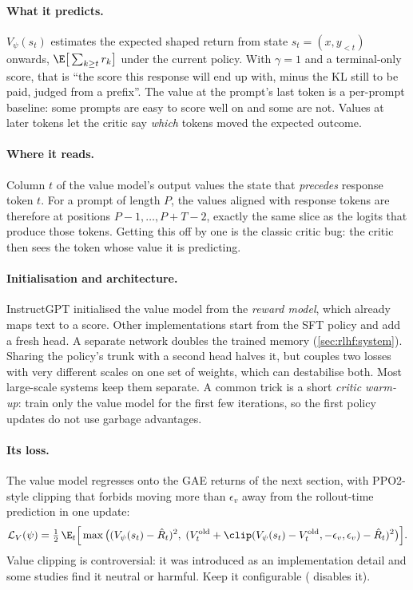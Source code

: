 \paragraph{What it predicts.} $V_\psi(s_t)$ estimates the expected shaped return from state
$s_t = (x, y_{<t})$ onwards, $\E\big[\sum_{k\ge t} r_k\big]$ under the current policy. With
$\gamma=1$ and a terminal-only score, that is ``the score this response will end up with,
minus the KL still to be paid, judged from a prefix''. The value at the prompt's last token is
a per-prompt baseline: some prompts are easy to score well on and some are not. Values at later
tokens let the critic say \emph{which} tokens moved the expected outcome.

\paragraph{Where it reads.} Column $t$ of the value model's output values the state that
\emph{precedes} response token $t$. For a prompt of length $P$, the values aligned with response
tokens are therefore at positions $P-1,\dots,P+T-2$, exactly the same slice as the logits that
produce those tokens. Getting this off by one is the classic critic bug: the critic then sees the
token whose value it is predicting.

\paragraph{Initialisation and architecture.} InstructGPT initialised the value model from the
\emph{reward model}, which already maps text to a score. Other implementations start from the
SFT policy and add a fresh head. A separate network doubles the trained memory
(\cref{sec:rlhf:system}). Sharing the policy's trunk with a second head halves it, but couples
two losses with very different scales on one set of weights, which can destabilise both. Most
large-scale systems keep them separate. A common trick is a short \emph{critic warm-up}: train
only the value model for the first few iterations, so the first policy updates do not use
garbage advantages.

\paragraph{Its loss.} The value model regresses onto the GAE returns of the next section, with
PPO2-style clipping that forbids moving more than $\epsilon_v$ away from the rollout-time
prediction in one update:
\begin{equation}
  \mathcal{L}_V(\psi) = \tfrac12\,\E_t\Big[\max\big((V_\psi(s_t)-\hat R_t)^2,\;
   (V^{\text{old}}_t + \clip(V_\psi(s_t)-V^{\text{old}}_t,-\epsilon_v,\epsilon_v)-\hat R_t)^2\big)\Big].
  \label{eq:rlhf:vloss}
\end{equation}
Value clipping is controversial: it was introduced as an implementation detail and some studies
find it neutral or harmful. Keep it configurable ( disables it).

